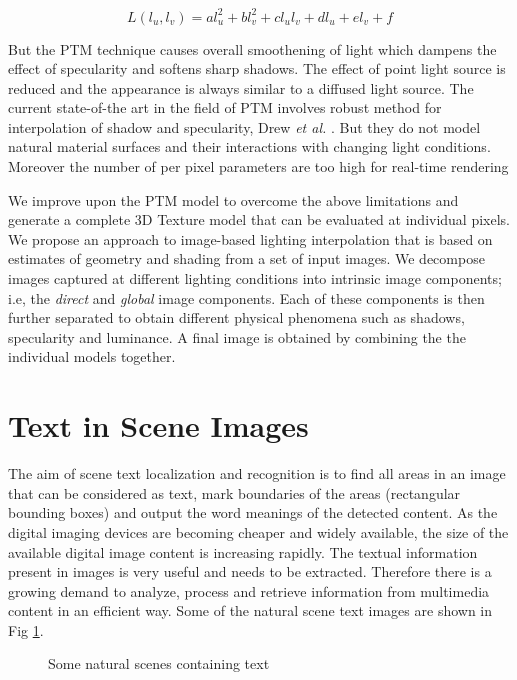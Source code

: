 \begin{equation}
L(l_u,l_v) = al_u^2 + bl_v^2 + cl_ul_v + dl_u + el_v +f
\end{equation}

But the PTM technique causes overall smoothening of light which dampens the effect
of specularity and softens sharp shadows. The effect of point light source is
reduced and the appearance is always similar to a diffused light source.  
The current state-of-the art in the field of PTM involves robust
method for interpolation of shadow and specularity, Drew {\em et al.} 
\cite{chap2-9}. But they do not model natural material surfaces and
their interactions with changing light conditions. Moreover
the number of per pixel parameters are too high for real-time
rendering

We improve upon the PTM model to overcome the above limitations
and generate a complete 3D Texture model that can be evaluated at individual
pixels. We propose an approach to image-based lighting interpolation that is
based on estimates of geometry and shading from a set of input images. We
decompose images captured at different lighting conditions into intrinsic image
components; i.e, the {\em direct} and {\em global} image components. Each of
these components is then further separated to obtain different physical
phenomena such as shadows, specularity and luminance. A final image is obtained
by combining the the individual models together.

\section{Text in Scene Images}

The aim of scene text localization and recognition is to find all areas in
an image that can be considered as text, mark
boundaries of the areas (rectangular bounding boxes) and output the word meanings of the detected content.
As the digital imaging devices are becoming cheaper and widely available, 
the size of the available digital image content is increasing rapidly.
The textual information present in images is very useful and needs to be extracted.
Therefore there is a growing demand to analyze, process and retrieve information
from multimedia content in an efficient way.
Some of the natural scene text images are shown in Fig \ref{fig:scene}.

\begin{figure}[t]
\centering
{}
\caption
{Some natural scenes containing text}
\label{fig:scene}
\end{figure}

